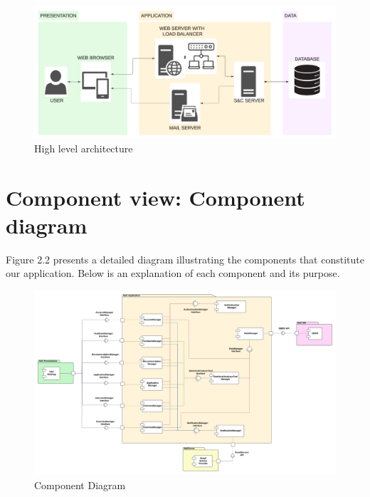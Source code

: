 \begin{figure}[H]
    \centering
    \includegraphics[width=0.9\linewidth]{DD//Images/3tier.png}
    \caption{High level architecture }
\end{figure}

\section{Component view: Component diagram}

Figure 2.2 presents a detailed diagram illustrating the components that constitute our application. Below is an explanation of each component and its purpose.

\begin{figure}[H]
    \centering
    \includegraphics[width=1.1\linewidth]{DD//Images/ComponentDiagram.png}
    \caption{Component Diagram }
\end{figure}




